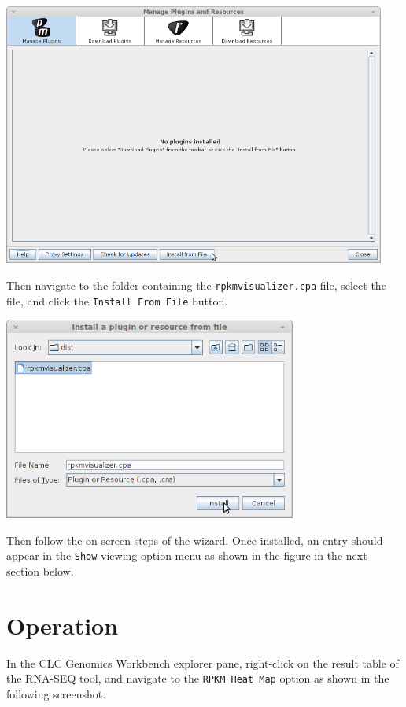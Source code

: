 \documentclass[12pt,letterpaper]{article}
\begin{document}
\begin{center}
    \includegraphics[width=34em]{install-from-file-button.png}
\end{center}

Then navigate to the folder containing the \texttt{rpkmvisualizer.cpa} file,
select the file, and click the \texttt{Install From File} button.

\begin{center}
    \includegraphics[width=26em]{install-button.png}
\end{center}

Then follow the on-screen steps of the wizard.  Once installed, an entry should
appear in the \texttt{Show} viewing option menu as shown in the figure in the
next section below.

\section{Operation}

In the CLC Genomics Workbench explorer pane, right-click on the result table of
the RNA-SEQ tool, and navigate to the \texttt{RPKM Heat Map} option as shown in
the following screenshot.
\end{document}
